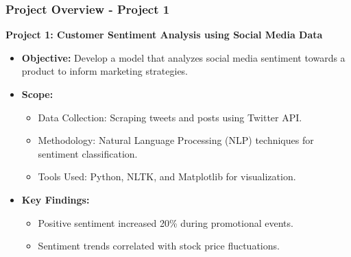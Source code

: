 \documentclass[aspectratio=169]{beamer}
\begin{document}
\begin{frame}[fragile]
    \frametitle{Project Overview - Project 1}
    \textbf{Project 1: Customer Sentiment Analysis using Social Media Data}
    \begin{itemize}
        \item \textbf{Objective:} Develop a model that analyzes social media sentiment towards a product to inform marketing strategies.
        \item \textbf{Scope:}
        \begin{itemize}
            \item Data Collection: Scraping tweets and posts using Twitter API.
            \item Methodology: Natural Language Processing (NLP) techniques for sentiment classification.
            \item Tools Used: Python, NLTK, and Matplotlib for visualization.
        \end{itemize}
        \item \textbf{Key Findings:}
        \begin{itemize}
            \item Positive sentiment increased 20\% during promotional events.
            \item Sentiment trends correlated with stock price fluctuations.
        \end{itemize}
    \end{itemize}
\end{frame}
\end{document}
